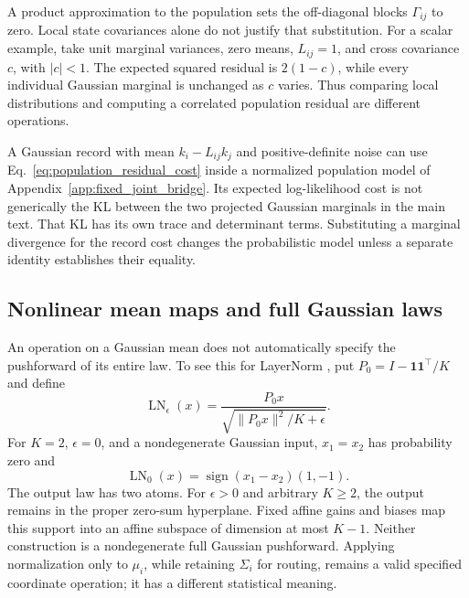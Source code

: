 \documentclass[twoside,11pt]{article}
\begin{document}
A product approximation to the population sets the off-diagonal blocks \(\Gamma_{ij}\) to zero. Local state covariances alone do not justify that substitution. For a scalar example, take unit marginal variances, zero means, \(L_{ij}=1\), and cross covariance \(c\), with \(|c|<1\). The expected squared residual is \(2(1-c)\), while every individual Gaussian marginal is unchanged as \(c\) varies. Thus comparing local distributions and computing a correlated population residual are different operations.

A Gaussian record with mean \(k_i-L_{ij}k_j\) and positive-definite noise can use Eq.~\eqref{eq:population_residual_cost} inside a normalized population model of Appendix~\ref{app:fixed_joint_bridge}. Its expected log-likelihood cost is not generically the KL between the two projected Gaussian marginals in the main text. That KL has its own trace and determinant terms. Substituting a marginal divergence for the record cost changes the probabilistic model unless a separate identity establishes their equality.

\subsection{Nonlinear mean maps and full Gaussian laws}
\label{sec:nonlinear_gaussian_scope}

An operation on a Gaussian mean does not automatically specify the pushforward of its entire law. To see this for LayerNorm \citep{ba2016layernorm}, put \(P_0=I-\mathbf1\mathbf1^\top/K\) and define
\begin{equation}
\operatorname{LN}_\epsilon(x)
=\frac{P_0x}{\sqrt{\|P_0x\|^2/K+\epsilon}}.
\label{eq:layernorm_gaussian_scope}
\end{equation}
For \(K=2\), \(\epsilon=0\), and a nondegenerate Gaussian input, \(x_1=x_2\) has probability zero and
\begin{equation}
\operatorname{LN}_0(x)
=\operatorname{sign}(x_1-x_2)(1,-1).
\label{eq:layernorm_two_atoms}
\end{equation}
The output law has two atoms. For \(\epsilon>0\) and arbitrary \(K\ge2\), the output remains in the proper zero-sum hyperplane. Fixed affine gains and biases map this support into an affine subspace of dimension at most \(K-1\). Neither construction is a nondegenerate full Gaussian pushforward. Applying normalization only to \(\mu_i\), while retaining \(\Sigma_i\) for routing, remains a valid specified coordinate operation; it has a different statistical meaning.
\end{document}
